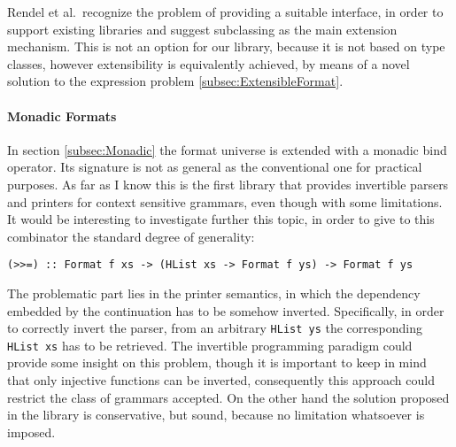 \documentclass[../Thesis.tex]{subfiles}
\begin{document}
Rendel et al.\ recognize the problem of providing a suitable interface,
in order to support existing libraries and suggest subclassing
as the main extension mechanism. This is not an option
for our library, because it is not based on type classes, however
extensibility is equivalently achieved, by means of a novel
solution to the expression problem \ref{subsec:ExtensibleFormat}.

\paragraph{Monadic Formats}
In section \ref{subsec:Monadic} the format universe is extended 
with a monadic bind operator. 
Its signature is not as general as the conventional one for practical purposes.
As far as I know this is the first library that provides
invertible parsers and printers for context sensitive grammars, even
though with some limitations.
It would be interesting to investigate further this topic, in order
to give to this combinator the standard degree of generality:
\begin{verbatim}
(>>=) :: Format f xs -> (HList xs -> Format f ys) -> Format f ys
\end{verbatim}
The problematic part lies in the printer semantics, in which the
dependency embedded by the continuation has to be somehow inverted. Specifically, in order to correctly invert the parser, 
from an arbitrary \texttt{HList ys} the corresponding \texttt{HList xs}
has to be retrieved.
The invertible programming paradigm could provide some insight on this problem, though it is important to keep in mind that only injective functions
can be inverted, consequently this approach could restrict the 
class of grammars accepted.
On the other hand the solution proposed in the library is conservative, but sound, because no limitation whatsoever is imposed.
\end{document}

